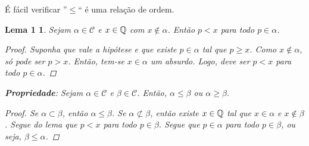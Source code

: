 \documentclass[a4paper,12pt]{article}
\newtheorem*{l1}{Lema 1}
\begin{document}
É fácil verificar ''$\leq$`` é uma relação de ordem.

\begin{l1}
	
	Sejam $\alpha \in \mathcal C$ e $x \in \Bbb Q$ com $x \notin \alpha$. Então $p < x$ para todo $p \in \alpha$.
	
	\begin{proof}
		
		Suponha que vale a hipótese e que existe $p \in \alpha$ tal que $p \geq x$. Como $x \notin \alpha$, só pode ser $p > x$. Então, tem-se $x \in \alpha$ um absurdo. Logo, deve ser $p < x$ para todo $p \in \alpha$.
		
	\end{proof}

\noindent \textbf{Propriedade}: Sejam $\alpha \in \mathcal C$ e $\beta \in \mathcal C$. Então, $\alpha \leq \beta$ ou $\alpha \geq \beta$.

	\begin{proof}
		
		Se $\alpha \subset \beta$, então $\alpha \leq \beta$. Se $\alpha \not \subset \beta$, então existe $x \in \Bbb Q$ tal que $x \in \alpha$ e $x \notin \beta$. Segue do lema que $p < x$ para todo $p \in \beta$. Segue que $p \in \alpha$ para todo $p \in \beta$, ou seja, $\beta \leq \alpha$.
		
	\end{proof}
	
	\end{l1}

\end{document}
